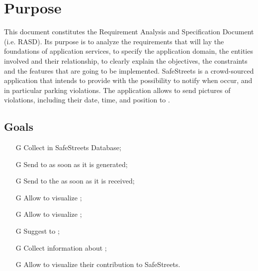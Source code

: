 \documentclass[../../RASD.tex]{subfiles}
\begin{document}
\section{Purpose\label{sect:1.1}}

This document constitutes the Requirement Analysis and Specification Document (i.e. RASD). Its purpose is to analyze the requirements that will lay the foundations of application services, to specify the application domain, the entities involved and their relationship, to clearly explain the objectives, the constraints and the features that are going to be implemented. \newline
SafeStreets is a crowd-sourced application that intends to provide  with the possibility to notify  when  occur, and in particular parking violations. The application allows  to send pictures of violations, including their date, time, and position to .
			
\subsection{Goals\label{sect:1.1.1}}

\begin{itemize}
		\item[G\subs{1}]Collect  in SafeStreets Database;
		\item[G\subs{2}]Send  to  as soon as it is generated;
		\item[G\subs{3}]Send  to the  as soon as it is received;
		\item[G\subs{4}]Allow  to visualize ;
		\item[G\subs{5}]Allow  to visualize ;
		\item[G\subs{6}]Suggest  to ;
		\item[G\subs{7}]Collect information about ;
		\item[G\subs{8}]Allow  to visualize their contribution to SafeStreets.
\end{itemize}
\end{document}
